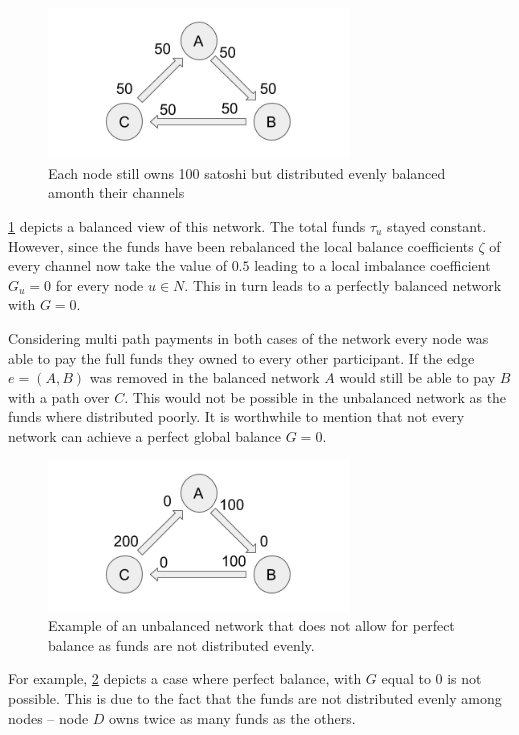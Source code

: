 \documentclass[a4paper]{paper}
\begin{document}
\begin{figure}
 \centering
 \includegraphics[width=8cm]{img/evenBalanced.png}
 \caption{Each node still owns 100 satoshi but distributed evenly balanced amonth their channels}
 \label{fig:evenBalanced}
\end{figure}

\cref{fig:evenBalanced} depicts a balanced view of this network.
The total funds $\tau_u$ stayed constant.
However, since the funds have been rebalanced the local balance coefficients $\zeta$ of every channel now take the value of $0.5$ leading to a local imbalance coefficient $G_u=0$ for every node $u\in N$.
This in turn leads to a perfectly balanced network with $G=0$.

Considering multi path payments in both cases of the network every node was able to pay the full funds they owned to every other participant.
If the edge $e=(A,B)$ was removed in the balanced network $A$ would still be able to pay $B$ with a path over $C$.
This would not be possible in the unbalanced network as the funds where distributed poorly.
It is worthwhile to mention that not every network can achieve a perfect global balance $G=0$.

\begin{figure}
 \centering
 \includegraphics[width=8cm]{img/oddUnbalanced.png}
 \caption{Example of an unbalanced network that does not allow for perfect balance as funds are not distributed evenly.}
 \label{fig:oddUnbalanced}
\end{figure}

For example, \cref{fig:oddUnbalanced} depicts a case where perfect balance, with $G$ equal to $0$  is not possible. 
This is due to the fact that the funds are not distributed evenly among nodes -- node $D$ owns twice as many funds as the others.
\end{document}
